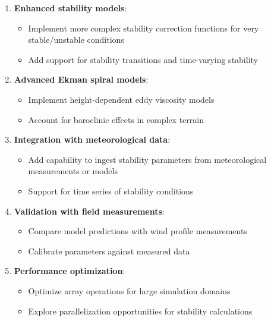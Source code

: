\documentclass{article}
\begin{document}
\begin{enumerate}[label=\arabic*.]
\item
  \textbf{Enhanced stability models}:

  \begin{itemize}[label=\textbullet]
  \item
    Implement more complex stability correction functions for very
    stable/unstable conditions
  \item
    Add support for stability transitions and time-varying stability
  \end{itemize}
\item
  \textbf{Advanced Ekman spiral models}:

  \begin{itemize}[label=\textbullet]
  \item
    Implement height-dependent eddy viscosity models
  \item
    Account for baroclinic effects in complex terrain
  \end{itemize}
\item
  \textbf{Integration with meteorological data}:

  \begin{itemize}[label=\textbullet]
  \item
    Add capability to ingest stability parameters from meteorological
    measurements or models
  \item
    Support for time series of stability conditions
  \end{itemize}
\item
  \textbf{Validation with field measurements}:

  \begin{itemize}[label=\textbullet]
  \item
    Compare model predictions with wind profile measurements
  \item
    Calibrate parameters against measured data
  \end{itemize}
\item
  \textbf{Performance optimization}:

  \begin{itemize}[label=\textbullet]
  \item
    Optimize array operations for large simulation domains
  \item
    Explore parallelization opportunities for stability calculations
  \end{itemize}
\end{enumerate}
\end{document}
